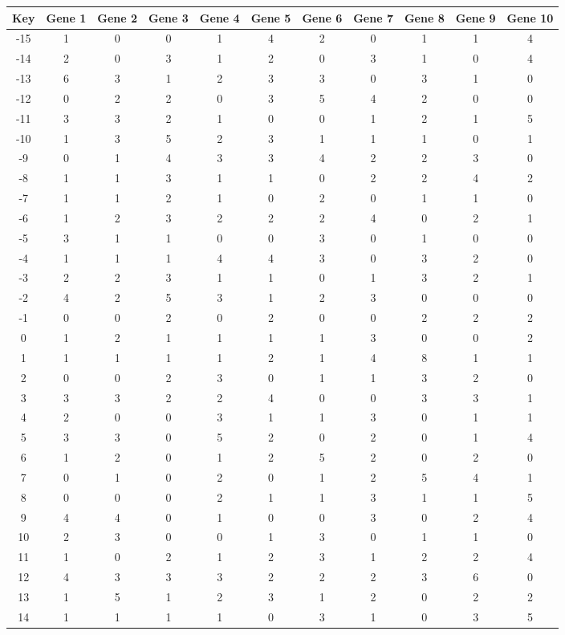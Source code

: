 \begin{tabular}{|c|c|c|c|c|c|c|c|c|c|c|}
\hline
Key & Gene 1 & Gene 2 & Gene 3 & Gene 4 & Gene 5 & Gene 6 & Gene 7 & Gene 8 & Gene 9 & Gene 10 \\
\hline
-15 & 1 & 0 & 0 & 1 & 4 & 2 & 0 & 1 & 1 & 4 \\
-14 & 2 & 0 & 3 & 1 & 2 & 0 & 3 & 1 & 0 & 4 \\
-13 & 6 & 3 & 1 & 2 & 3 & 3 & 0 & 3 & 1 & 0 \\
-12 & 0 & 2 & 2 & 0 & 3 & 5 & 4 & 2 & 0 & 0 \\
-11 & 3 & 3 & 2 & 1 & 0 & 0 & 1 & 2 & 1 & 5 \\
-10 & 1 & 3 & 5 & 2 & 3 & 1 & 1 & 1 & 0 & 1 \\
-9 & 0 & 1 & 4 & 3 & 3 & 4 & 2 & 2 & 3 & 0 \\
-8 & 1 & 1 & 3 & 1 & 1 & 0 & 2 & 2 & 4 & 2 \\
-7 & 1 & 1 & 2 & 1 & 0 & 2 & 0 & 1 & 1 & 0 \\
-6 & 1 & 2 & 3 & 2 & 2 & 2 & 4 & 0 & 2 & 1 \\
-5 & 3 & 1 & 1 & 0 & 0 & 3 & 0 & 1 & 0 & 0 \\
-4 & 1 & 1 & 1 & 4 & 4 & 3 & 0 & 3 & 2 & 0 \\
-3 & 2 & 2 & 3 & 1 & 1 & 0 & 1 & 3 & 2 & 1 \\
-2 & 4 & 2 & 5 & 3 & 1 & 2 & 3 & 0 & 0 & 0 \\
-1 & 0 & 0 & 2 & 0 & 2 & 0 & 0 & 2 & 2 & 2 \\
0 & 1 & 2 & 1 & 1 & 1 & 1 & 3 & 0 & 0 & 2 \\
1 & 1 & 1 & 1 & 1 & 2 & 1 & 4 & 8 & 1 & 1 \\
2 & 0 & 0 & 2 & 3 & 0 & 1 & 1 & 3 & 2 & 0 \\
3 & 3 & 3 & 2 & 2 & 4 & 0 & 0 & 3 & 3 & 1 \\
4 & 2 & 0 & 0 & 3 & 1 & 1 & 3 & 0 & 1 & 1 \\
5 & 3 & 3 & 0 & 5 & 2 & 0 & 2 & 0 & 1 & 4 \\
6 & 1 & 2 & 0 & 1 & 2 & 5 & 2 & 0 & 2 & 0 \\
7 & 0 & 1 & 0 & 2 & 0 & 1 & 2 & 5 & 4 & 1 \\
8 & 0 & 0 & 0 & 2 & 1 & 1 & 3 & 1 & 1 & 5 \\
9 & 4 & 4 & 0 & 1 & 0 & 0 & 3 & 0 & 2 & 4 \\
10 & 2 & 3 & 0 & 0 & 1 & 3 & 0 & 1 & 1 & 0 \\
11 & 1 & 0 & 2 & 1 & 2 & 3 & 1 & 2 & 2 & 4 \\
12 & 4 & 3 & 3 & 3 & 2 & 2 & 2 & 3 & 6 & 0 \\
13 & 1 & 5 & 1 & 2 & 3 & 1 & 2 & 0 & 2 & 2 \\
14 & 1 & 1 & 1 & 1 & 0 & 3 & 1 & 0 & 3 & 5 \\
\hline
\end{tabular}